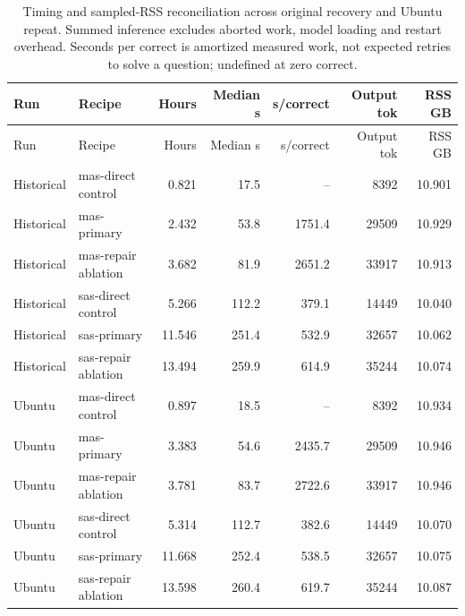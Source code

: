 {\small\setlength{\tabcolsep}{3pt}\begin{longtable}{llrrrrr}
\caption{Timing and sampled-RSS reconciliation across original recovery and Ubuntu repeat. Summed inference excludes aborted work, model loading and restart overhead. Seconds per correct is amortized measured work, not expected retries to solve a question; undefined at zero correct.}\label{tab:resource-reconcile}\\
Run & Recipe & Hours & Median s & s/correct & Output tok & RSS GB\\\toprule\endfirsthead
Run & Recipe & Hours & Median s & s/correct & Output tok & RSS GB\\\toprule\endhead
Historical & mas-direct control & 0.821 & 17.5 & -- & 8392 & 10.901\\
Historical & mas-primary & 2.432 & 53.8 & 1751.4 & 29509 & 10.929\\
Historical & mas-repair ablation & 3.682 & 81.9 & 2651.2 & 33917 & 10.913\\
Historical & sas-direct control & 5.266 & 112.2 & 379.1 & 14449 & 10.040\\
Historical & sas-primary & 11.546 & 251.4 & 532.9 & 32657 & 10.062\\
Historical & sas-repair ablation & 13.494 & 259.9 & 614.9 & 35244 & 10.074\\
Ubuntu & mas-direct control & 0.897 & 18.5 & -- & 8392 & 10.934\\
Ubuntu & mas-primary & 3.383 & 54.6 & 2435.7 & 29509 & 10.946\\
Ubuntu & mas-repair ablation & 3.781 & 83.7 & 2722.6 & 33917 & 10.946\\
Ubuntu & sas-direct control & 5.314 & 112.7 & 382.6 & 14449 & 10.070\\
Ubuntu & sas-primary & 11.668 & 252.4 & 538.5 & 32657 & 10.075\\
Ubuntu & sas-repair ablation & 13.598 & 260.4 & 619.7 & 35244 & 10.087\\
\bottomrule\end{longtable}}